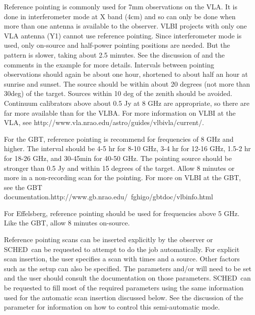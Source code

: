 \documentclass{report}
\newcommand{\schedb}{{\sc SCHED~}}
\begin{document}
Reference pointing is commonly used for 7mm observations on the VLA.
It is done in interferometer mode at X band (4cm) and so can only be
done when more than one antenna is available to the observer.  VLBI
projects with only one VLA antenna (Y1) cannot use reference pointing.
Since interferometer mode is used, only on-source and half-power
pointing positions are needed.  But the pattern is slower, taking
about 2.5 minutes.  See the discussion of  and the comments in the example
 for more
details.  Intervals between pointing observations should again be
about one hour, shortened to about half an hour at sunrise and sunset.
The source should be within about 20 degrees (not more than 30deg) of
the target.  Sources within 10 deg of the zenith should be avoided.
Continuum calibrators above about 0.5 Jy at 8 GHz are appropriate, so
there are far more available than for the VLBA.  For more information
on VLBI at the VLA, see 
{http://www.vla.nrao.edu/astro/guides/vlbivla/current/}.

For the GBT, reference pointing is recommend for frequencies of 8 GHz
and higher.  The interval should be 4-5 hr for 8-10 GHz, 3-4 hr for
12-16 GHz, 1.5-2 hr for 18-26 GHz, and 30-45min for 40-50 GHz.  The
pointing source should be stronger than 0.5 Jy and within 15 degrees
of the target.  Allow 8 minutes or more in a non-recording scan for
the pointing.  For more on VLBI at the GBT, see \htmladdnormallink
{the GBT documentation.}{http://www.gb.nrao.edu/~fghigo/gbtdoc/vlbinfo.html}

For Effelsberg, reference pointing should be used for frequencies 
above 5 GHz.  Like the GBT, allow 8 minutes on-source.

Reference pointing scans can be inserted explicitly by the observer or
\schedb can be requested to attempt to do the job automatically.  For
explicit scan insertion, the user specifies a scan with times and a
source.  Other factors such as the setup can also be specified.  The
parameters  and/or  will need to be set and the user should consult
the documentation on those parameters.  \schedb can be requested to
fill most of the required parameters using the same information used
for the automatic scan insertion discussed below.  See the discussion
of the parameter  for information on
how to control this semi-automatic mode.
\end{document}
